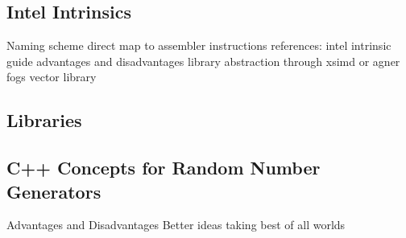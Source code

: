 \documentclass[crop=false]{standalone}
\begin{document}

    \subsection{Intel Intrinsics} %
    \label{sub:intel_intrinsics}
      Naming scheme
      direct map to assembler instructions
      references: intel intrinsic guide
      advantages and disadvantages
      library abstraction through xsimd or agner fogs vector library

    \subsection{Libraries} %
    \label{sub:libraries}


    \subsection{C++ Concepts for Random Number Generators} %
    \label{sub:c_concepts_for_random_number_generators}
      Advantages and Disadvantages
      Better ideas
      taking best of all worlds
\end{document}
